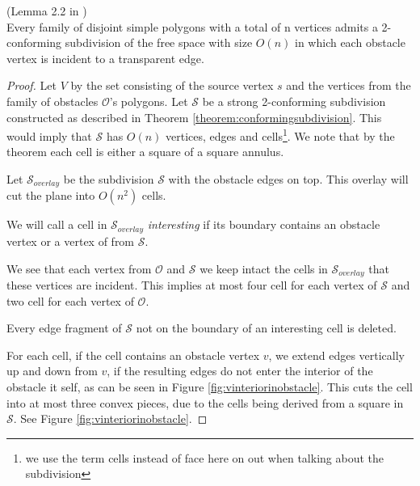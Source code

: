 \begin{Lemma}(Lemma 2.2 in \cite{HershbergerS99})
\label{lemma:admitsa2conformingsubdivision}\\
Every family of disjoint simple polygons with a total of n vertices admits a 2-conforming
subdivision of the free space with size $O(n)$ in which each obstacle vertex is incident
to a transparent edge.
\end{Lemma}

\begin{proof}
Let $V$ by the set consisting of the source vertex $s$ and the vertices from the family of 
obstacles $\mathcal{O}$'s polygons. Let $\mathcal{S}$ be a strong 2-conforming subdivision 
constructed as described in Theorem \ref{theorem:conformingsubdivision}. This would imply 
that $\mathcal{S}$ has $O(n)$ vertices, edges and cells\footnote{we use the term cells 
instead of face here on out when talking about the subdivision}. We note that by the 
theorem each cell is either a square of a square annulus. 

Let $\mathcal{S}_{overlay}$ be the subdivision $\mathcal{S}$ with the obstacle edges on 
top. This overlay will cut the plane into $O(n^2)$ cells. 

We will call a cell in $\mathcal{S}_{overlay}$ \textit{interesting} if its boundary 
contains an obstacle vertex or a vertex of from $\mathcal{S}$. 

We see that each vertex from $\mathcal{O}$ and $\mathcal{S}$ we keep intact the cells in 
$\mathcal{S}_{overlay}$ that these vertices are incident. This implies at most four cell 
for each vertex of $\mathcal{S}$ and two cell for each vertex of $\mathcal{O}$. 

Every edge fragment of $\mathcal{S}$ not on the boundary of an interesting cell is 
deleted.

For each cell, if the cell contains an obstacle vertex $v$, we extend edges vertically up 
and down from $v$, if the resulting edges do not enter the interior of the obstacle it 
self, as can be seen in Figure \ref{fig:vinteriorinobstacle}. This cuts the cell into at 
most three convex pieces, due to the cells being derived from a square in $\mathcal{S}$. 
See Figure \ref{fig:vinteriorinobstacle}. 




\end{proof}
